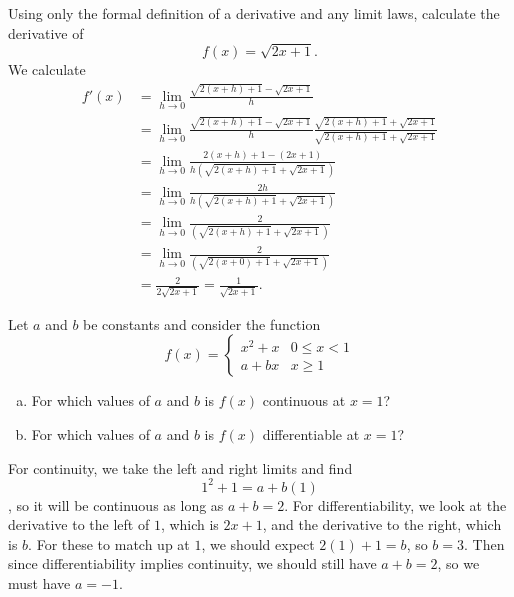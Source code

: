 \documentclass[11pt]{exam}
\theoremstyle{definition}
\begin{document}
\begin{questions}
\newpage
\question[7]
Using only the formal definition of a derivative and any limit laws, calculate the derivative of
$$f(x) = \sqrt{2x+1}.$$
We calculate
\begin{align*}
f'(x)
  &= \lim_{h\rightarrow0}\frac{\sqrt{2(x+h)+1}-\sqrt{2x+1}}{h}\\
  &= \lim_{h\rightarrow0}\frac{\sqrt{2(x+h)+1}-\sqrt{2x+1}}{h}\frac{\sqrt{2(x+h)+1}+\sqrt{2x+1}}{\sqrt{2(x+h)+1}+\sqrt{2x+1}}\\
  &= \lim_{h\rightarrow0}\frac{2(x+h)+1-(2x+1)}{h(\sqrt{2(x+h)+1}+\sqrt{2x+1})}\\
  &= \lim_{h\rightarrow0}\frac{2h}{h(\sqrt{2(x+h)+1}+\sqrt{2x+1})}\\
  &= \lim_{h\rightarrow0}\frac{2}{(\sqrt{2(x+h)+1}+\sqrt{2x+1})}\\
  &= \lim_{h\rightarrow0}\frac{2}{(\sqrt{2(x+0)+1}+\sqrt{2x+1})}\\
  &= \frac{2}{2\sqrt{2x+1}} = \frac{1}{\sqrt{2x+1}}.
\end{align*}

\newpage
\question[7]
Let $a$ and $b$ be constants and consider the function
$$f(x) = \left\lbrace\begin{array}{cc}
x^2 + x & 0\leq x < 1\\
a + bx  & x\geq 1
\end{array}\right.$$
\begin{enumerate}[(a)]
\item For which values of $a$ and $b$ is $f(x)$ continuous at $x=1$?
\vspace{3in}
\item For which values of $a$ and $b$ is $f(x)$ differentiable at $x=1$?
\end{enumerate}

For continuity, we take the left and right limits and find $$1^2 + 1 = a + b(1)$$, so it will be continuous as long as $a+b=2$.
For differentiability, we look at the derivative to the left of $1$, which is $2x+1$, and the derivative to the right, which is $b$.  For these to match up at $1$, we should expect $2(1) + 1 = b$, so $b=3$.  Then since differentiability implies continuity, we should still have $a+b=2$, so we must have $a=-1$.

\end{questions}
\end{document}
